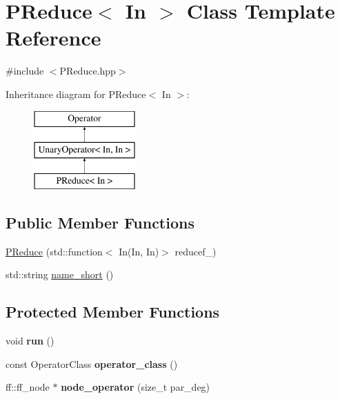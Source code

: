 \hypertarget{class_p_reduce}{\section{\-P\-Reduce$<$ \-In $>$ \-Class \-Template \-Reference}
\label{class_p_reduce}
}


{\ttfamily \#include $<$\-P\-Reduce.\-hpp$>$}

\-Inheritance diagram for \-P\-Reduce$<$ \-In $>$\-:\begin{figure}[H]
\begin{center}
\leavevmode
\includegraphics[height=3.000000cm]{class_p_reduce}
\end{center}
\end{figure}
\subsection*{\-Public \-Member \-Functions}
\begin{DoxyCompactItemize}
\item 
\hyperlink{class_p_reduce_a31e0899ba12232bd9d629281a145c219}{\-P\-Reduce} (std\-::function$<$ \-In(\-In, \-In)$>$ reducef\-\_\-)
\item 
std\-::string \hyperlink{class_p_reduce_aeec2fa6ffc97684cc42b6dda26d498d4}{name\-\_\-short} ()
\end{DoxyCompactItemize}
\subsection*{\-Protected \-Member \-Functions}
\begin{DoxyCompactItemize}
\item 
\hypertarget{class_p_reduce_a23d34226d830ba05591373ff0fb745b2}{void {\bfseries run} ()}\label{class_p_reduce_a23d34226d830ba05591373ff0fb745b2}

\item 
\hypertarget{class_p_reduce_af20857bc855fb223be6720efa12f0fb6}{const \-Operator\-Class {\bfseries operator\-\_\-class} ()}\label{class_p_reduce_af20857bc855fb223be6720efa12f0fb6}

\item 
\hypertarget{class_p_reduce_a63a1552b01009c2b13f12f4f25d44603}{ff\-::ff\-\_\-node $\ast$ {\bfseries node\-\_\-operator} (size\-\_\-t par\-\_\-deg)}\label{class_p_reduce_a63a1552b01009c2b13f12f4f25d44603}

\end{DoxyCompactItemize}
